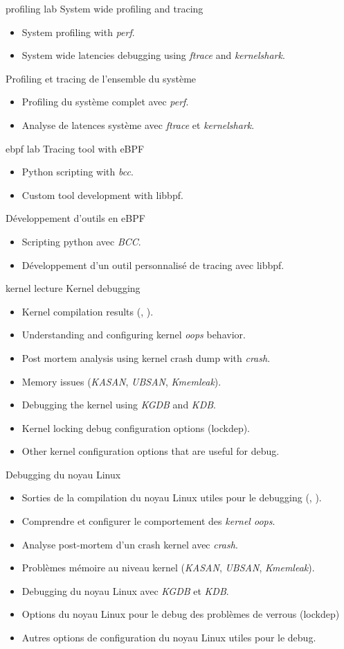 {profiling}
{lab}
{System wide profiling and tracing}
{
  \begin{itemize}
  \item System profiling with {\em perf}.
  \item System wide latencies debugging using {\em ftrace} and {\em
  kernelshark}.
  \end{itemize}
}
{Profiling et tracing de l'ensemble du système}
{
  \begin{itemize}
  \item Profiling du système complet avec {\em perf}.
  \item Analyse de latences système avec {\em ftrace} et {\em kernelshark}.
  \end{itemize}
}
{ebpf}
{lab}
{Tracing tool with eBPF}
{
  \begin{itemize}
  \item Python scripting with {\em bcc}.
  \item Custom tool development with libbpf.
  \end{itemize}
}
{Développement d'outils en eBPF}
{
  \begin{itemize}
  \item Scripting python avec {\em BCC}.
  \item Développement d'un outil personnalisé de tracing avec libbpf.
  \end{itemize}
}
{kernel}
{lecture}
{Kernel debugging}
{
  \begin{itemize}
  \item Kernel compilation results (, ).
  \item Understanding and configuring kernel {\em oops} behavior.
  \item Post mortem analysis using kernel crash dump with {\em crash}.
  \item Memory issues ({\em KASAN}, {\em UBSAN}, {\em Kmemleak}).
  \item Debugging the kernel using {\em KGDB} and {\em KDB}.
  \item Kernel locking debug configuration options (lockdep).
  \item Other kernel configuration options that are useful for debug.
  \end{itemize}
}
{Debugging du noyau Linux}
{
  \begin{itemize}
  \item Sorties de la compilation du noyau Linux utiles pour le
    debugging (, ).
  \item Comprendre et configurer le comportement des {\em kernel oops}.
  \item Analyse post-mortem d'un crash kernel avec {\em crash}.
  \item Problèmes mémoire au niveau kernel ({\em KASAN}, {\em UBSAN}, {\em Kmemleak}).
  \item Debugging du noyau Linux avec {\em KGDB} et {\em KDB}.
  \item Options du noyau Linux pour le debug des problèmes de verrous
    (lockdep)
  \item Autres options de configuration du noyau Linux utiles pour le
    debug.
  \end{itemize}
}
